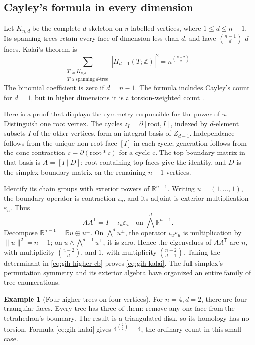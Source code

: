 \documentclass[11pt]{article}
\theoremstyle{definition}
\newtheorem{example}[theorem]{Example}
\theoremstyle{remark}
\newcommand{\Z}{\mathbb Z}
\newcommand{\R}{\mathbb R}
\begin{document}
\subsection{Cayley's formula in every dimension}

Let \(K_{n,d}\) be the complete \(d\)-skeleton on \(n\) labelled
vertices, where \(1\le d\le n-1\).  Its spanning trees retain every
face of dimension less than \(d\), and have \(\binom{n-1}{d}\)
\(d\)-faces.  Kalai's theorem is
\begin{equation}
 \boxed{\displaystyle
 \sum_{\substack{T\subseteq K_{n,d}\\
             T\text{ a spanning }d\text{-tree}}}
 |\widetilde H_{d-1}(T;\Z)|^2
       =n^{\binom{n-2}{d}}.}
 \label{eq:gih-kalai}
\end{equation}
The binomial coefficient is zero if \(d=n-1\).  The formula includes
Cayley's count for \(d=1\), but in higher dimensions it is a
torsion-weighted count \cite{gih-kalai}.

Here is a proof that displays the symmetry responsible for the power
of \(n\).  Distinguish one root vertex.  The cycles
\(z_I=\partial[\text{root},I]\), indexed by \(d\)-element subsets
\(I\) of the other vertices, form an integral basis of
\(Z_{d-1}\).  Independence follows from the unique non-root face
\([I]\) in each cycle; generation follows from the cone contraction
\(c=\partial(\text{root}*c)\) for a cycle \(c\).  The top boundary
matrix in that basis is
\(A=[I\mid D]\): root-containing top faces give the identity, and
\(D\) is the simplex boundary matrix on the remaining \(n-1\) vertices.

Identify its chain groups with exterior powers of \(\R^{n-1}\).
Writing \(u=(1,\ldots,1)\), the boundary operator is contraction
\(\iota_u\), and its adjoint is exterior multiplication
\(\varepsilon_u\).  Thus
\[
 AA^{\mathsf T}=I+\iota_u\varepsilon_u
                  \quad\text{on }\bigwedge^d\R^{n-1}.
\]
Decompose \(\R^{n-1}=\R u\oplus u^\perp\).  On
\(\bigwedge^d u^\perp\), the operator \(\iota_u\varepsilon_u\)
is multiplication by \(\|u\|^2=n-1\); on
\(u\wedge\bigwedge^{d-1}u^\perp\), it is zero.  Hence the eigenvalues
of \(AA^{\mathsf T}\) are \(n\), with multiplicity
\(\binom{n-2}{d}\), and \(1\), with multiplicity
\(\binom{n-2}{d-1}\).  Taking the determinant in
\eqref{eq:gih-higher-cb} proves \eqref{eq:gih-kalai}.
The full simplex's permutation symmetry and its exterior algebra have
organized an entire family of tree enumerations.

\begin{example}[Four higher trees on four vertices]
For \(n=4,d=2\), there are four triangular faces.  Every tree has three
of them: remove any one face from the tetrahedron's boundary.  The
result is a triangulated disk, so its homology has no torsion.  Formula
\eqref{eq:gih-kalai} gives \(4^{\binom22}=4\), the ordinary count in
this small case.
\end{example}
\end{document}
